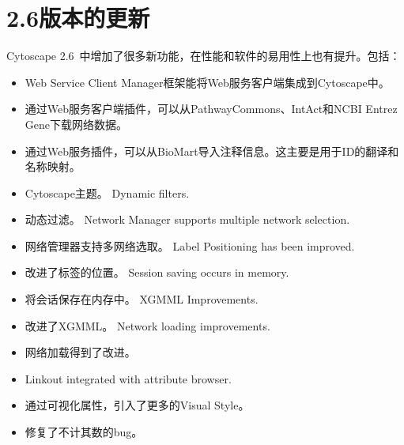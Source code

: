 \section{2.6版本的更新}
Cytoscape 2.6~中增加了很多新功能，在性能和软件的易用性上也有提升。包括：
\begin{itemize}
\item Web Service Client Manager框架能将Web服务客户端集成到Cytoscape中。
\item 通过Web服务客户端插件，可以从PathwayCommons、IntAct和NCBI Entrez Gene下载网络数据。
\item 通过Web服务插件，可以从BioMart导入注释信息。这主要是用于ID的翻译和名称映射。
\item Cytoscape主题。
Dynamic filters.
\item 动态过滤。
Network Manager supports multiple network selection.
\item 网络管理器支持多网络选取。
Label Positioning has been improved.
\item 改进了标签的位置。
Session saving occurs in memory.
\item 将会话保存在内存中。
XGMML Improvements.
\item 改进了XGMML。
Network loading improvements.
\item 网络加载得到了改进。
\item Linkout integrated with attribute browser.
\item 通过可视化属性，引入了更多的Visual Style。
\item 修复了不计其数的bug。
\end{itemize}
